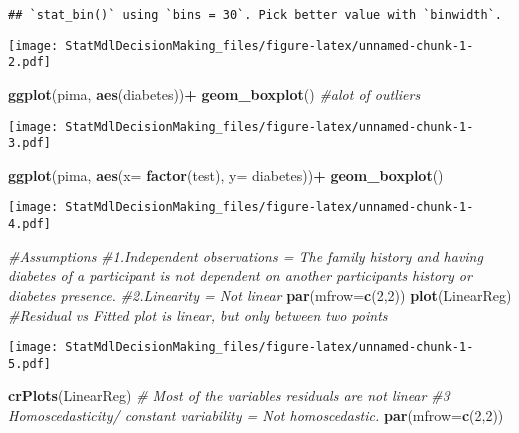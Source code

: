 \documentclass[
]{article}
\newenvironment{Shaded}{\begin{snugshade}}{\end{snugshade}}
\newcommand{\AttributeTok}[1]{\textcolor[rgb]{0.13,0.29,0.53}{#1}}
\newcommand{\CommentTok}[1]{\textcolor[rgb]{0.56,0.35,0.01}{\textit{#1}}}
\newcommand{\DecValTok}[1]{\textcolor[rgb]{0.00,0.00,0.81}{#1}}
\newcommand{\FunctionTok}[1]{\textcolor[rgb]{0.13,0.29,0.53}{\textbf{#1}}}
\newcommand{\NormalTok}[1]{#1}
\newcommand{\SpecialCharTok}[1]{\textcolor[rgb]{0.81,0.36,0.00}{\textbf{#1}}}
\begin{document}
\begin{verbatim}
## `stat_bin()` using `bins = 30`. Pick better value with `binwidth`.
\end{verbatim}

\texttt{[image: StatMdlDecisionMaking\_files/figure-latex/unnamed-chunk-1-2.pdf]}

\begin{Shaded}
\begin{Highlighting}[]
    \FunctionTok{ggplot}\NormalTok{(pima, }\FunctionTok{aes}\NormalTok{(diabetes))}\SpecialCharTok{+}
      \FunctionTok{geom\_boxplot}\NormalTok{() }\CommentTok{\#alot of outliers}
\end{Highlighting}
\end{Shaded}

\texttt{[image: StatMdlDecisionMaking\_files/figure-latex/unnamed-chunk-1-3.pdf]}

\begin{Shaded}
\begin{Highlighting}[]
    \FunctionTok{ggplot}\NormalTok{(pima, }\FunctionTok{aes}\NormalTok{(}\AttributeTok{x=} \FunctionTok{factor}\NormalTok{(test), }\AttributeTok{y=}\NormalTok{ diabetes))}\SpecialCharTok{+}
        \FunctionTok{geom\_boxplot}\NormalTok{()}
\end{Highlighting}
\end{Shaded}

\texttt{[image: StatMdlDecisionMaking\_files/figure-latex/unnamed-chunk-1-4.pdf]}

\begin{Shaded}
\begin{Highlighting}[]
  \CommentTok{\#Assumptions}
    \CommentTok{\#1.Independent observations = The family history and having diabetes of a participant is not dependent on another participant\textquotesingle{}s history or diabetes presence. }
    \CommentTok{\#2.Linearity = Not linear}
      \FunctionTok{par}\NormalTok{(}\AttributeTok{mfrow=}\FunctionTok{c}\NormalTok{(}\DecValTok{2}\NormalTok{,}\DecValTok{2}\NormalTok{))}
      \FunctionTok{plot}\NormalTok{(LinearReg) }\CommentTok{\#Residual vs Fitted plot is linear, but only between two points}
\end{Highlighting}
\end{Shaded}

\texttt{[image: StatMdlDecisionMaking\_files/figure-latex/unnamed-chunk-1-5.pdf]}

\begin{Shaded}
\begin{Highlighting}[]
      \FunctionTok{crPlots}\NormalTok{(LinearReg) }\CommentTok{\# Most of the variables\textquotesingle{} residuals are not linear}
    \CommentTok{\#3 Homoscedasticity/ constant variability = Not homoscedastic.}
      \FunctionTok{par}\NormalTok{(}\AttributeTok{mfrow=}\FunctionTok{c}\NormalTok{(}\DecValTok{2}\NormalTok{,}\DecValTok{2}\NormalTok{))}
\end{Highlighting}
\end{Shaded}
\end{document}
